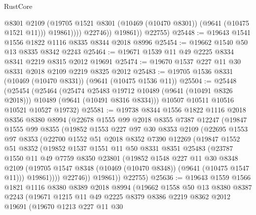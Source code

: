 \begin{lexlean}{RustCore}
\begin{coremodule}
                      @8301
                      @2109
                      (@19705 @1521 @8301 (@10469 (@10470 @8301)) (@9641 (@10475 @1521 @11)))
                      @19861))))
              @22746))
          @19861))
      @22755)
@25448 := @19643 @1541 @1556 @1822 @1116 @8335 @8344 @2018 @8996
@25454 := @19662 @1540 @50 @13 @8335 @8342 @2243
@25464 := @19671 @1539 @11 @49 @2225 @8334 @8341 @2219 @8315 @2012 @19691
@25474 := @19670 @1537 @227 @11 @30 @8331 @2018 @2109 @2219 @8325 @2012
@25483 := @19705 @1536 @8331 (@10469 (@10470 @8331)) (@9641 (@10475 @1536 @11))
@25504 := @25448
    (@25454
      (@25464
        (@25474 @25483 @19712 @10489 (@9641 (@10491 @8326 @2018)))
        @10489
        (@9641 (@10491 @8316 @8334)))
      @10507
      @10511
      @10516
      @10521
      @10527
      @19732)
@25581 := @19738
    @8344
    @1556
    @1822
    @1116
    @2018
    @8356
    @8380
    @8994
    (@22678
      @1555
      @99
      @2018
      @8355
      @7387
      @12247
      (@19847
        @1555
        @99
        @8355
        (@19852
          @1553
          @227
          @97
          @30
          @8353
          @2109
          (@22695
            @1553
            @97
            @8353
            (@22700
              @1552
              @51
              @2018
              @8352
              @7390
              @12269
              (@19847
                @1552
                @51
                @8352
                (@19852
                  @1537
                  @1551
                  @11
                  @50
                  @8331
                  @8351
                  @25483
                  (@23787
                    @1550
                    @11
                    @49
                    @7759
                    @8350
                    @23801
                    (@19852
                      @1548
                      @227
                      @11
                      @30
                      @8348
                      @2109
                      (@19705 @1547 @8348 (@10469 (@10470 @8348)) (@9641 (@10475 @1547 @11)))
                      @19861))))
              @22746))
          @19861))
      @22755)
@25636 := @19643
    @1559
    @1566
    @1821
    @1116
    @8380
    @8389
    @2018
    @8994
    (@19662
      @1558
      @50
      @13
      @8380
      @8387
      @2243
      (@19671
        @1215
        @11
        @49
        @2225
        @8379
        @8386
        @2219
        @8362
        @2012
        @19691
        (@19670
          @1213
          @227
          @11
          @30

\end{coremodule}
\end{lexlean}
